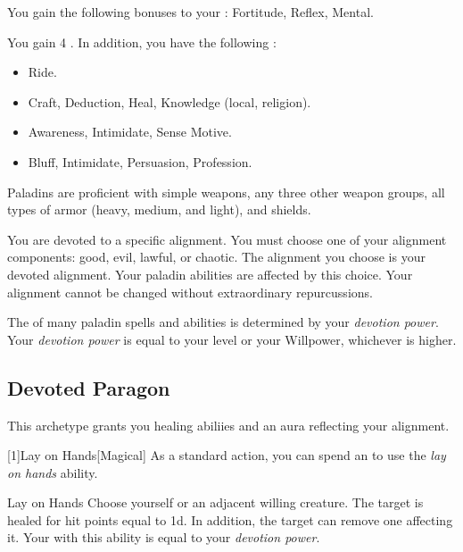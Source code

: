         You gain the following bonuses to your :  Fortitude,  Reflex,  Mental.

        You gain 4 .
        In addition, you have the following :
        \begin{itemize}
            \item {} Ride.
            \item {} Craft, Deduction, Heal, Knowledge (local, religion).
            \item {} Awareness, Intimidate, Sense Motive.
            \item {} Bluff, Intimidate, Persuasion, Profession.
        \end{itemize}

        Paladins are proficient with simple weapons, any three other weapon groups, all types of armor (heavy, medium, and light), and shields.

        You are devoted to a specific alignment.
        You must choose one of your alignment components: good, evil, lawful, or chaotic.
        The alignment you choose is your devoted alignment.
        Your paladin abilities are affected by this choice.
        Your alignment cannot be changed without extraordinary repurcussions.

        The  of many paladin spells and abilities is determined by your \textit{devotion power}.
        Your \textit{devotion power} is equal to your level or your Willpower, whichever is higher.

    \subsection{Devoted Paragon}
        This archetype grants you healing abiliies and an aura reflecting your alignment.

        [1]{Lay on Hands}[Magical] As a standard action, you can spend an  to use the \textit{lay on hands} ability.
        \begin{ability}{Lay on Hands}
            Choose yourself or an adjacent willing creature.
            The target is healed for hit points equal to  \plus1d.
            In addition, the target can remove one  affecting it.
            Your  with this ability is equal to your \textit{devotion power}.
        \end{ability}

